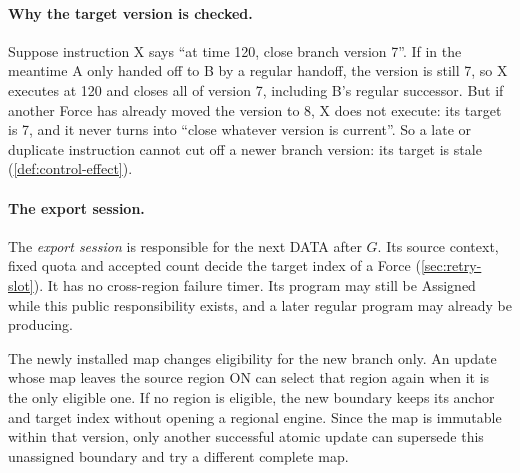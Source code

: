 \documentclass[11pt,a4paper]{article}
\newcommand{\defterm}[1]{\textcolor{rrBlue}{\textit{#1}}}
\begin{document}
\paragraph{Why the target version is checked.}
Suppose instruction X says ``at time 120, close branch version 7''. If
in the meantime A only handed off to B by a regular handoff, the version
is still 7, so X executes at 120 and closes all of version 7, including
B's regular successor. But if another Force has already moved the
version to 8, X does not execute: its target is 7, and it never turns
into ``close whatever version is current''. So a late or duplicate
instruction cannot cut off a newer branch version: its target is stale
(\cref{def:control-effect}).

\paragraph{The export session.}
The \defterm{export session} is responsible for the next DATA after $G$.
Its source context, fixed quota and accepted count decide the target
index of a Force (\cref{sec:retry-slot}). It has no cross-region failure
timer. Its program may still be Assigned while this public responsibility
exists, and a later regular program may already be producing.

The newly installed map changes eligibility for the new branch only. An
update whose map leaves the source region ON can select that region again
when it is the only eligible one. If no region is eligible, the new
boundary keeps its anchor and target index without opening a regional
engine. Since the map is immutable within that version, only another
successful atomic update can supersede this unassigned boundary and try
a different complete map.
\end{document}
